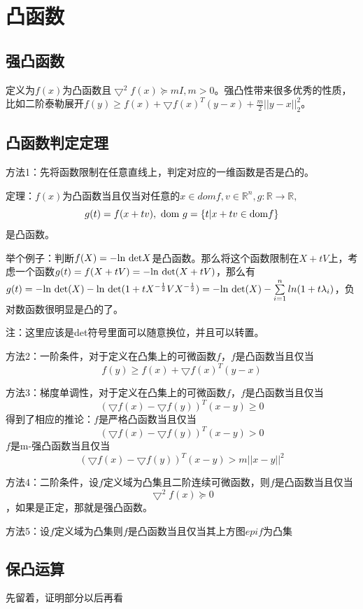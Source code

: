\documentclass{article}
\begin{document}
\section{凸函数}
\subsection{强凸函数}
定义为$f(x)$为凸函数且$\bigtriangledown ^2 f(x) \succeq mI ,m>0$。强凸性带来很多优秀的性质，比如二阶泰勒展开$f(y) \ge f(x)+\bigtriangledown f(x)^T (y-x)+\frac{m}{2}||y-x||^2_2$。
\subsection{凸函数判定定理}
方法1：先将函数限制在任意直线上，判定对应的一维函数是否是凸的。

定理：$f(x)$为凸函数当且仅当对任意的$x \in domf,v \in \mathbb{R}^n,g:\mathbb{R} \rightarrow \mathbb{R},$
$$g(t)=f(x+tv),\ {\rm dom}  \ g=\{t|x+tv \in {\rm dom} f\}$$是凸函数。

举个例子：判断$f(X)=-{\rm ln \ det}X$是凸函数。那么将这个函数限制在$X+tV$上，考虑一个函数$g(t)=f(X+tV)=-{\rm ln \ det}(X+tV)$，那么有$g(t)=-{\rm ln \ det}(X)-{\rm ln \ det}(1+tX^{-\frac{1}{2}}VX^{-\frac{1}{2}})=-{\rm ln \ det}(X)-\sum\limits_{i=1}^n ln(1+t \lambda_i)$，负对数函数很明显是凸的了。

注：这里应该是det符号里面可以随意换位，并且可以转置。

方法2：一阶条件，对于定义在凸集上的可微函数$f$，$f$是凸函数当且仅当$$f(y) \ge f(x)+\bigtriangledown f(x)^T(y-x)$$

方法3：梯度单调性，对于定义在凸集上的可微函数$f$，$f$是凸函数当且仅当$$(\bigtriangledown f(x)-\bigtriangledown f(y))^T(x-y) \ge 0$$
得到了相应的推论：$f$是严格凸函数当且仅当$$(\bigtriangledown f(x)-\bigtriangledown f(y))^T(x-y) > 0$$
$f$是m-强凸函数当且仅当$$(\bigtriangledown f(x)-\bigtriangledown f(y))^T(x-y) > m||x-y||^2$$

方法4：二阶条件，设$f$定义域为凸集且二阶连续可微函数，则$f$是凸函数当且仅当$$\bigtriangledown^2 f(x) \succeq 0 $$，如果是正定，那就是强凸函数。

方法5：设$f$定义域为凸集则$f$是凸函数当且仅当其上方图$epi f$为凸集
\subsection{保凸运算}
先留着，证明部分以后再看
\end{document}
